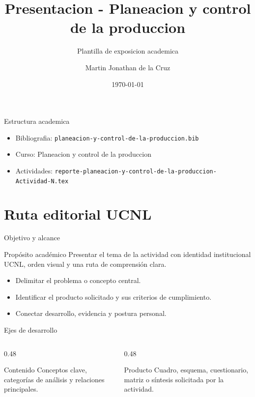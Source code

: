 ﻿\documentclass[spanish,aspectratio=169]{beamer}
\title{Presentacion - Planeacion y control de la produccion}
\subtitle{Plantilla de exposicion academica}
\author{Martin Jonathan de la Cruz}
\institute{Universidad Ciudadana de Nuevo Leon}
\date{\today}
\begin{document}
\begin{frame}
  \titlepage
\end{frame}

\begin{frame}{Estructura academica}
  \begin{itemize}
    \item Bibliografia: \texttt{planeacion-y-control-de-la-produccion.bib}
    \item Curso: Planeacion y control de la produccion
    \item Actividades: \texttt{reporte-planeacion-y-control-de-la-produccion-Actividad-N.tex}
  \end{itemize}
\end{frame}


\section{Ruta editorial UCNL}

\begin{frame}{Objetivo y alcance}
  \begin{block}{Propósito académico}
    Presentar el tema de la actividad con identidad institucional UCNL, orden visual y una ruta de comprensión clara.
  \end{block}
  \begin{itemize}
    \item Delimitar el problema o concepto central.
    \item Identificar el producto solicitado y sus criterios de cumplimiento.
    \item Conectar desarrollo, evidencia y postura personal.
  \end{itemize}
\end{frame}

\begin{frame}{Ejes de desarrollo}
  \begin{columns}[T,totalwidth=\textwidth]
    \begin{column}{0.48\textwidth}
      \begin{block}{Contenido}
        Conceptos clave, categorías de análisis y relaciones principales.
      \end{block}
    \end{column}
    \begin{column}{0.48\textwidth}
      \begin{block}{Producto}
        Cuadro, esquema, cuestionario, matriz o síntesis solicitada por la actividad.
      \end{block}
    \end{column}
  \end{columns}
\end{frame}
\end{document}
